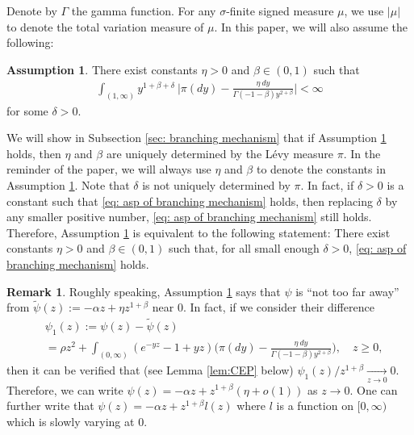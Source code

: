 \documentclass[12pt,a4paper]{amsart}
\theoremstyle{plain}
\theoremstyle{definition}
\newtheorem{rem}[thm]{Remark}
\newtheorem{asp}{Assumption}
\numberwithin{equation}{section}
\begin{document}
Denote by $\Gamma$ the gamma function.
For any $\sigma$-finite signed measure $\mu$, we use $|\mu|$ to denote the total variation measure of $\mu$.
In this paper, we will also assume the following:
\begin{asp}
  \label{asp: branching mechanism}
  There exist constants $\eta > 0$ and $\beta \in (0,1)$ such that
  \begin{align}
    \label{eq: asp of branching mechanism}
    \int_{(1,\infty)}y^{1+\beta +\delta}~\Big|\pi(dy)-\frac{\eta~dy}{\Gamma(-1-\beta)y^{2+\beta}}\Big| <\infty
  \end{align}
	for some $\delta > 0$.
\end{asp}
We will show in Subsection \ref{sec: branching mechanism} that if Assumption \ref{asp: branching mechanism} holds, then $\eta$ and $\beta$ are uniquely determined by the L\'evy measure $\pi$.
In the reminder of the paper, we will always use $\eta$ and $\beta$ to denote the constants in Assumption  \ref{asp: branching mechanism}.
	Note that $\delta$ is not uniquely determined by $\pi$.
	In fact, if $\delta>0$ is a constant such that \eqref{eq: asp of branching mechanism} holds, then replacing $\delta$ by any smaller positive number, \eqref{eq: asp of branching mechanism} still holds.
	Therefore, Assumption \ref{asp: branching mechanism} is equivalent to the following statement:
	There exist constants $\eta > 0$ and $\beta \in (0,1)$ such that, for all small enough $\delta>0$, \eqref{eq: asp of branching mechanism} holds.

\begin{rem}
  \label{rem:SP}
Roughly speaking, Assumption \ref{asp: branching mechanism} says that $\psi$ is ``not too far away'' from $\widetilde \psi(z) := - \alpha z + \eta z^{1+\beta}$ near $0$.
In fact, if we consider their difference
\begin{align}
  \label{eq:PB}
  & \psi_1(z)
  := \psi(z) - \widetilde \psi(z)
  \\ &= \rho z^2+ \int_{(0,\infty)}(e^{-yz}-1+yz) \Big(\pi(dy) - \frac{\eta~dy}{\Gamma(-1-\beta) y^{2+\beta}}\Big),
  \quad z\geq 0,
\end{align}
then it can be verified that (see Lemma \ref{lem:CEP} below) $\psi_1(z)/z^{1+\beta} \xrightarrow[z\to 0]{} 0$.
Therefore, we can write $ \psi(z)  = - \alpha z + z^{1+\beta}(\eta + o(1))$ as $z\to 0$.
One can further write that $\psi(z) = - \alpha z + z^{1+\beta} l(z)$ where $l$ is a function on $[0,\infty)$ which is slowly varying at $0$.
\end{rem}
\end{document}
